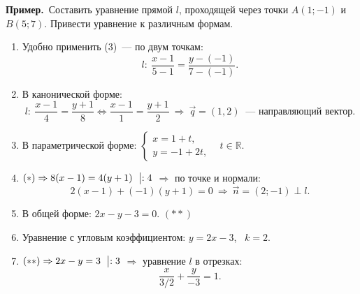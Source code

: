 \documentclass[a4paper,11pt]{article}
\newcommand{\prim}{\textbf{Пример.}\ }
\begin{document}
\prim Составить уравнение прямой $l$, проходящей через точки $A(1;-1)$ и $B(5;7)$. Привести уравнение
к различным формам.
\begin{enumerate}[label=\arabic*)]
\item Удобно применить (3)~--- по двум точкам:
\[
l:\ \frac{x-1}{5-1}=\frac{y-(-1)}{7-(-1)}.\tag{$*$}
\]
\item В канонической форме:
\[
l:\ \frac{x-1}{4}=\frac{y+1}{8}\iff\frac{x-1}{1}=\frac{y+1}{2}\ \Rightarrow\ \vec q=(1,2)\ \text{~--- направляющий вектор}.
\]
\item В параметрической форме:
$\begin{cases}x=1+t,\\y=-1+2t,\end{cases}$ \ $t\in\mathbb R$.
\item $(*)\Rightarrow 8(x-1)=4(y+1)\ \bigm|:4$ $\Rightarrow$ по точке и нормали:
\[
2(x-1)+(-1)(y+1)=0\ \Rightarrow\ \vec n=(2;-1)\perp l.
\]
\item В общей форме: $2x-y-3=0$. \hfill $(**)$
\item Уравнение с угловым коэффициентом: $y=2x-3$, \ $k=2$.
\item $(**)\Rightarrow 2x-y=3\ \bigm|:3$ $\Rightarrow$ уравнение $l$ в отрезках:
\[
\frac{x}{3/2}+\frac{y}{-3}=1.
\]
\begin{center}
\end{center}
\end{enumerate}
\end{document}

